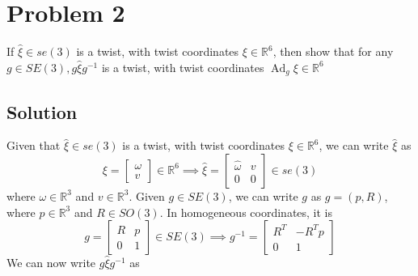 \section*{Problem 2}
\setcounter{section}{2}
\setcounter{equation}{0}

If \( \widehat{\xi} \in s e(3) \) is a twist, with twist coordinates \( \xi \in \mathbb{R}^{6} \), then show that for any \( g \in S E(3), g \widehat{\xi} g^{-1} \) is a twist, with twist coordinates \( \operatorname{Ad}_{g} \xi \in \mathbb{R}^{6} \)

\subsection*{Solution}

Given that \( \widehat{\xi} \in s e(3) \) is a twist, with twist coordinates \( \xi \in \mathbb{R}^{6} \), we can write \( \widehat{\xi} \) as
\begin{equation}
    \xi
    =
    \begin{bmatrix}
        \omega \\
        v
    \end{bmatrix}
    \in \mathbb{R}^{6}
    \implies
    \widehat{\xi}
    =
    \begin{bmatrix}
        \widehat{\omega} & v \\
        0                & 0
    \end{bmatrix}
    \in s e(3)
\end{equation}\label{eq:twist}
where \( \omega \in \mathbb{R}^{3} \) and \( v \in \mathbb{R}^{3} \).
Given \( g \in S E(3) \), we can write \( g \) as \( g = (p, R) \), where \( p \in \mathbb{R}^{3} \) and \( R \in S O(3) \).
In homogeneous coordinates, it is
\begin{equation*}
    g
    =
    \begin{bmatrix}
        R & p \\
        0 & 1
    \end{bmatrix}
    \in S E(3)
    \implies
    g^{-1}
    =
    \begin{bmatrix}
        R^{T} & -R^{T} p \\
        0     & 1
    \end{bmatrix}
\end{equation*}
We can now write \( g \widehat{\xi} g^{-1} \) as

